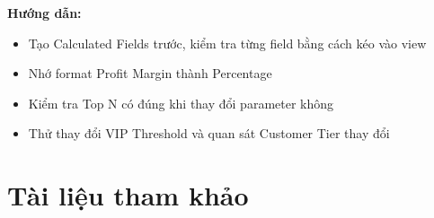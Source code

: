 \documentclass[12pt]{article}
\begin{document}
\noindent \textbf{Hướng dẫn:}
\begin{itemize}[nosep]
    \item Tạo Calculated Fields trước, kiểm tra từng field bằng cách kéo vào view
    \item Nhớ format Profit Margin thành Percentage
    \item Kiểm tra Top N có đúng khi thay đổi parameter không
    \item Thử thay đổi VIP Threshold và quan sát Customer Tier thay đổi
\end{itemize}

\newpage
\section{Tài liệu tham khảo}
\label{section:references}
\nocite{*}
\vspace{-3.2em}
\printbibliography
\end{document}
